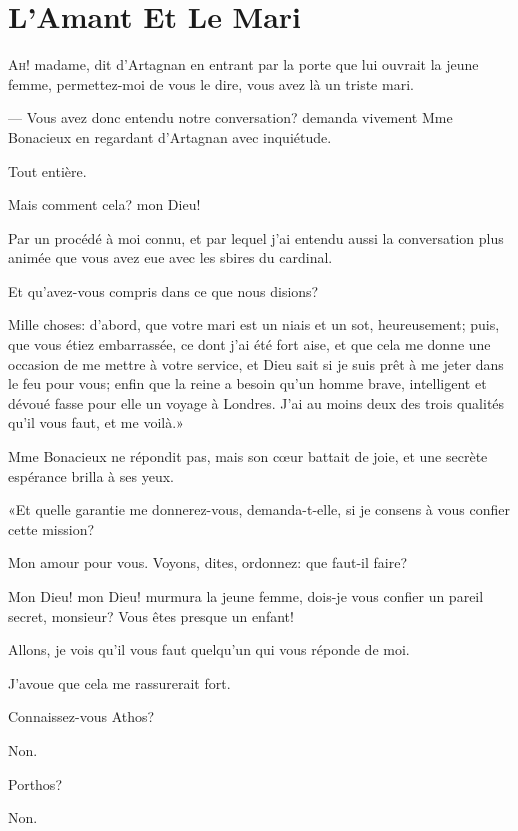 
\chapter{L'Amant Et Le Mari} 

\lettrine[ante=«]{A}{h!} madame, dit d'Artagnan en entrant par la porte que lui ouvrait la jeune femme, permettez-moi de vous le dire, vous avez là un triste mari. 

\zz
\noindent --- Vous avez donc entendu notre conversation? demanda vivement Mme Bonacieux en regardant d'Artagnan avec inquiétude. 

\zz
\speak  Tout entière. 

\speak  Mais comment cela? mon Dieu! 

\speak  Par un procédé à moi connu, et par lequel j'ai entendu aussi la conversation plus animée que vous avez eue avec les sbires du cardinal. 

\speak  Et qu'avez-vous compris dans ce que nous disions? 

\speak  Mille choses: d'abord, que votre mari est un niais et un sot, heureusement; puis, que vous étiez embarrassée, ce dont j'ai été fort aise, et que cela me donne une occasion de me mettre à votre service, et Dieu sait si je suis prêt à me jeter dans le feu pour vous; enfin que la reine a besoin qu'un homme brave, intelligent et dévoué fasse pour elle un voyage à Londres. J'ai au moins deux des trois qualités qu'il vous faut, et me voilà.» 

Mme Bonacieux ne répondit pas, mais son cœur battait de joie, et une secrète espérance brilla à ses yeux. 

«Et quelle garantie me donnerez-vous, demanda-t-elle, si je consens à vous confier cette mission? 

\speak  Mon amour pour vous. Voyons, dites, ordonnez: que faut-il faire? 

\speak  Mon Dieu! mon Dieu! murmura la jeune femme, dois-je vous confier un pareil secret, monsieur? Vous êtes presque un enfant! 

\speak  Allons, je vois qu'il vous faut quelqu'un qui vous réponde de moi. 

\speak  J'avoue que cela me rassurerait fort. 

\speak  Connaissez-vous Athos? 

\speak  Non. 

\speak  Porthos? 

\speak  Non. 

